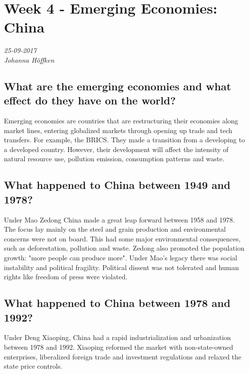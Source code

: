 \chapter{Week 4 - Emerging Economies: China}
\textit{25-09-2017 \\
Johanna Höffken}

\section{What are the emerging economies and what effect do they have on the world?}
Emerging economies are countries that are restructuring their economies along market lines, entering globalized markets through opening up trade and tech transfers. For example, the BRICS. They made a transition from a developing to a developed country. However, their development will affect the intensity of natural resource use, pollution emission, consumption patterns and waste. 

\section{What happened to China between 1949 and 1978?}
Under Mao Zedong China made a great leap forward between 1958 and 1978. The focus lay mainly on the steel and grain production and environmental concerns were not on board. This had some major environmental consequences, such as deforestation, pollution and waste. Zedong also promoted the population growth: "more people can produce more". Under Mao's legacy there was social instability and political fragility. Political dissent was not tolerated and human rights like freedom of press were violated. 

\section{What happened to China between 1978 and 1992?}
Under Deng Xiaoping, China had a rapid industrialization and urbanization between 1978 and 1992. Xiaoping reformed the market with non-state-owned enterprises, liberalized foreign trade and investment regulations and relaxed the state price controls.  

